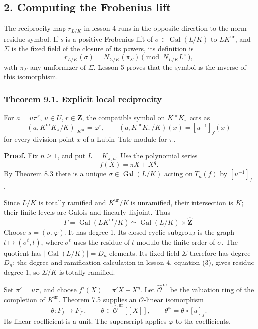 \documentclass[11pt,a4paper]{article}
\begin{document}
\subsection{2. Computing the Frobenius
lift}\label{computing-the-frobenius-lift}

The reciprocity map \(r_{L/K}\) in lesson 4 runs in the opposite
direction to the norm residue symbol. If \(s\) is a positive Frobenius
lift of \(\sigma\in\operatorname{Gal}(L/K)\) to \(LK^{\mathrm{ur}}\),
and \(\Sigma\) is the fixed field of the closure of its powers, its
definition is \[
r_{L/K}(\sigma)
 =N_{\Sigma/K}(\pi_\Sigma)\pmod{N_{L/K}L^\times},
\tag{2}
\] with \(\pi_\Sigma\) any uniformizer of \(\Sigma\). Lesson 5 proves
that the symbol is the inverse of this isomorphism.

\subsubsection{Theorem 9.1. Explicit local
reciprocity}\label{theorem-9.1.-explicit-local-reciprocity}

For \(a=u\pi^r\), \(u\in U\), \(r\in\mathbf Z\), the compatible symbol
on \(K^{\mathrm{ur}}K_\pi\) acts as \[
(a,K^{\mathrm{ur}}K_\pi/K)|_{K^{\mathrm{ur}}}=\varphi^r,
\qquad
(a,K^{\mathrm{ur}}K_\pi/K)(x)=[u^{-1}]_f(x)
\tag{3}
\] for every division point \(x\) of a Lubin--Tate module for \(\pi\).

\textbf{Proof.} Fix \(n\geq1\), and put \(L=K_{\pi,n}\). Use the
polynomial series \[
f(X)=\pi X+X^q.
\] By Theorem 8.3 there is a unique \(\sigma\in\operatorname{Gal}(L/K)\)
acting on \(T_n(f)\) by \([u^{-1}]_f\).

Since \(L/K\) is totally ramified and \(K^{\mathrm{ur}}/K\) is
unramified, their intersection is \(K\); their finite levels are Galois
and linearly disjoint. Thus \[
\Gamma=\operatorname{Gal}(LK^{\mathrm{ur}}/K)
 \simeq\operatorname{Gal}(L/K)\times\widehat{\mathbf Z}.
\] Choose \(s=(\sigma,\varphi)\). It has degree 1. Its closed cyclic
subgroup is the graph \(t\mapsto(\sigma^t,t)\), where \(\sigma^t\) uses
the residue of \(t\) modulo the finite order of \(\sigma\). The quotient
has \(|\operatorname{Gal}(L/K)|=D_n\) elements. Its fixed field
\(\Sigma\) therefore has degree \(D_n\); the degree and ramification
calculation in lesson 4, equation (3), gives residue degree 1, so
\(\Sigma/K\) is totally ramified.

Set \(\pi'=u\pi\), and choose \(f'(X)=\pi'X+X^q\). Let
\(\widehat{\mathcal O}^{\,\mathrm{ur}}\) be the valuation ring of the
completion of \(K^{\mathrm{ur}}\). Theorem 7.5 supplies an
\(\mathcal O\)-linear isomorphism \[
\theta:F_f\longrightarrow F_{f'},\qquad
\theta\in\widehat{\mathcal O}^{\,\mathrm{ur}}[[X]],\qquad
\theta^\varphi=\theta\circ[u]_f.
\tag{4}
\] Its linear coefficient is a unit. The superscript applies \(\varphi\)
to the coefficients.
\end{document}
